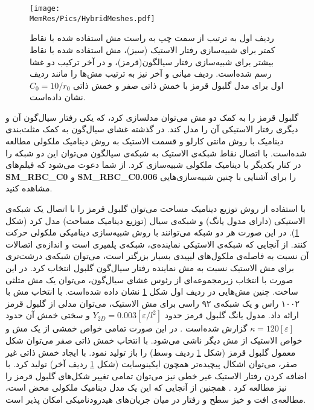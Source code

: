 \begin{figure}[h]
\begin{center}
\texttt{[image: \\MemRes/Pics/HybridMeshes.pdf]}
\caption{
ردیف اول به ترتیب از سمت چپ به راست مش‌ استفاده شده با نقاط کمتر  برای شبیه‌سازی رفتار الاستیک (سبز)، مش استفاده شده با نقاط بیشتر برای شبیه‌سازی رفتار سیالگون(قرمز)، و در آخر ترکیب دو غشا رسم شده‌است. ردیف میانی و آخر نیز به ترتیب مش‌ها را مانند ردیف اول برای 
مدل گلبول قرمز با خمش ذاتی صفر و خمش ذاتی 
$C_0=10/r_0$
نشان داده‌است.
}
\label{fig:hybridMeshes}
\end{center}
\end{figure}

 گلبول قرمز را به کمک دو مش می‌توان مدلسازی کرد، که یکی رفتار سیال‌گون آن  و دیگری رفتار الاستیکی آن را مدل کند. در گذشته غشای سیال‌گون به کمک مثلث‌بندی دینامیک با روش مانتی کارلو و قسمت الاستیک به روش دینامیک ملکولی مطالعه شده‌است. با اتصال نقاط شبکه‌ی الاستیک به شبکه‌ی سیالگون می‌توان این دو شبکه را در کنار یکدیگر با دینامیک ملکولی شبیه‌سازی کرد. از شما دعوت می‌شود که فیلم‌های
 {\bf  SM\_RBC\_C0}
 و
 {\bf SM\_RBC\_C0.006}
 را برای آشنایی با چنین شبیه‌سازی‌هایی مشاهده کنید.

با استفاده از روش توزیع دینامیک مساحت می‌توان گلبول قرمز را با اتصال یک شبکه‌ی الاستیکی (دارای مدول یانگ) و شبکه‌ی سیال‌ (توزیع دینامیک مساحت) مدل کرد (شکل
\ref{fig:hybridMeshes}).
  در این صورت هر دو شبکه می‌توانند با روش شبیه‌سازی دینامیکی ملکولی حرکت کنند. از آنجایی که شبکه‌ی الاستیکی نماینده‌ی، شبکه‌ی پلمیری است و اندازه‌ی اتصالات آن نسبت به فاصله‌ی ملکول‌های لیپیدی بسیار بزرگتر است، می‌توان شبکه‌ی درشت‌تری برای مش الاستیک نسبت به مش نماینده رفتار سیال‌گون گلبول انتخاب کرد. در این صورت با انتخاب زیرمجموعه‌ای از رئوس غشای سیال‌گون، می‌توان یک مش مثلثی ساخت. چنین مش‌هایی در ردیف اول شکل
\ref{fig:hybridMeshes}
نشان داده ‌شده‌است. با انتخاب مش با ۱۰۰۲ راس و یک شبکه‌ی ۹۲ راسی برای مش الاستیک، می‌توان مدلی از گلبول قرمز ارائه داد. مدول یانگ گلبول قرمز حدود 
$Y_{2D}=0.003 [\varepsilon/l^2]$
 و سختی خمش آن حدود
$\kappa=120 [\varepsilon]$ 
گزارش شده‌است
\cite{gomppernelson2012}.
 در این صورت تمامی خواص خمشی از یک مش و خواص الاستیک از مش دیگر ناشی می‌شود. با انتخاب خمش ذاتی صفر می‌توان شکل معمول گلبول قرمز (شکل 
\ref{fig:hybridMeshes}
ردیف وسط) را باز تولید نمود. با ایجاد خمش ذاتی غیر صفر، می‌توان اشکال پیچیده‌تر همچون ایکینوسایت 
(شکل
\ref{fig:hybridMeshes}
ردیف آخر) تولید کرد. با اضافه کردن رفتار الاستیک غیر خطی نیز می‌توان تمامی تغییر شکل‌های گلبول قرمز را نیز مطالعه کرد
\cite{Lim2002PNAS, Noguchi2005PNAS}.
 همچنین از آنجایی که این یک مدل دینامیک ملکولی‌ محض است، مطالعه‌ی افت و خیز سطح و رفتار در میان جریان‌های هیدرودنامیکی امکان پذیر است.






